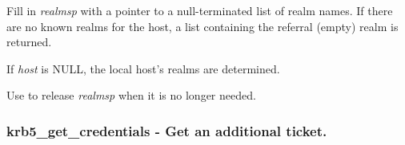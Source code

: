 \documentclass[letterpaper,10pt,english]{sphinxmanual}
\begin{document}
Fill in \emph{realmsp} with a pointer to a null-terminated list of realm names. If there are no known realms for the host, a list containing the referral (empty) realm is returned.

If \emph{host} is NULL, the local host's realms are determined.

Use {\hyperref[appdev/refs/api/krb5_free_host_realm:krb5_free_host_realm]{}} to release \emph{realmsp} when it is no longer needed.


\subsubsection{krb5\_get\_credentials -  Get an additional ticket.}
\label{appdev/refs/api/krb5_get_credentials:krb5-get-credentials-get-an-additional-ticket}\label{appdev/refs/api/krb5_get_credentials::doc}

\begin{fulllineitems}
\label{appdev/refs/api/krb5_get_credentials:krb5_get_credentials}
\end{fulllineitems}
\end{document}
